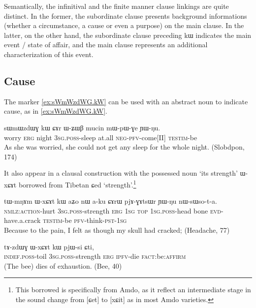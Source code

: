 \documentclass[oldfontcommands,oneside,a4paper,11pt]{article}
\newcommand{\ipa}[1]{{\phon #1}} %
\begin{document}
Semantically,  the infinitival and the finite manner clause linkings are quite distinct. In the former, the subordinate clause presents background informations (whether a circumstance, a cause or even a purpose) on the main clause. In the latter, on the other hand, the subordinate clause preceding \ipa{kɯ} indicates the main event / state of affair, and the main clause represents an additional characterization of this event.


\subsection{Cause} \label{sec:cause}

The marker \ref{ex:sWmWzdWG.kW} can be used with an abstract noun to indicate cause, as in \ref{ex:sWmWzdWG.kW}.

\begin{exe}
\ex \label{ex:sWmWzdWG.kW}
\gll 
\ipa{sɯmɯzdɯɣ}  	\ipa{kɯ}  	\ipa{ɕɤr}  	\ipa{ɯ-ʑɯβ}  	\ipa{mucin}  	\ipa{mɯ-pɯ-ɣe}  	\ipa{ɲɯ-ŋu.}  	 \\
worry \textsc{erg} night \textsc{3sg.poss}-sleep at.all \textsc{neg-pfv}-come[II] \textsc{testim}-be \\
\glt As she was worried, she could not get any sleep for the whole night. (Slobdpon, 174)
\end{exe}


  It also appear in a clausal construction with the possessed noun `its strength' \ipa{ɯ-xɕɤt} borrowed from Tibetan \ipa{ɕed} `strength'.\footnote{This borrowed is specifically from Amdo, as it reflect an intermediate stage in the sound change from [ɕet] to [xɕit] as in most Amdo varieties.}

 

\begin{exe}
\ex \label{ex:WxCAt.kW}
\gll
\ipa{tɯ-mŋɤm} 	\ipa{ɯ-xɕɤt} 	\ipa{kɯ} 	\ipa{aʑo} 	\ipa{nɯ} 	\ipa{a-ku} 	\ipa{ɕɤrɯ} 	\ipa{pjɤ-ɣɤtsɯr} 	\ipa{ɲɯ-ŋu} 	\ipa{nɯ-sɯso-t-a.} 	\\
\textsc{nmlz:action}-hurt \textsc{3sg.poss}-strength \textsc{erg} \textsc{1sg} \textsc{top} \textsc{1sg.poss}-head bone \textsc{evd}-have.a.crack \textsc{testim}-be \textsc{pfv}-think-\textsc{pst-1sg} \\
\glt Because to the pain, I felt as though my skull had cracked; (Headache, 77)
  \end{exe}

  \begin{exe}
\ex \label{ex:WxCAt.kW2}
\gll
  \ipa{tɤ-zdɯɣ} 	\ipa{ɯ-xɕɤt} 	\ipa{kɯ} 	\ipa{pjɯ-si} 	\ipa{ɕti,} \\
  \textsc{indef.poss}-toil  \textsc{3sg.poss}-strength \textsc{erg} \textsc{ipfv}-die \textsc{fact}:be:\textsc{affirm} \\
 \glt (The bee) dies of exhaustion. (Bee, 40)
  \end{exe}
  
\end{document}
